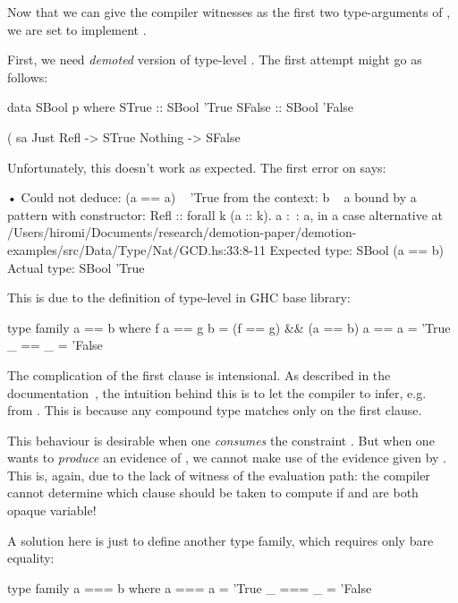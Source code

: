 \documentclass[demotion-paper.tex]{subfiles}
\begin{document}
Now that we can give the compiler witnesses as the first two type-arguments of , we are set to implement .

First, we need \emph{demoted} version of type-level \hask{(==)}.
The first attempt might go as follows:
\begin{code}
data SBool p where
  STrue  :: SBool 'True
  SFalse :: SBool 'False

(%
sa %
  Just Refl -> STrue
  Nothing -> SFalse
\end{code}
Unfortunately, this doesn't work as expected.
The first error on  says:

\begin{repl}
• Could not deduce: (a == a) ~ 'True
  from the context: b ~ a
    bound by a pattern with constructor:
               Refl :: forall k (a :: k). a :~: a,
             in a case alternative
    at /Users/hiromi/Documents/research/demotion-paper/demotion-examples/src/Data/Type/Nat/GCD.hs:33:8-11
  Expected type: SBool (a == b)
    Actual type: SBool 'True
\end{repl}

This is due to the definition of type-level \hask{(==)} in GHC base library:

\begin{code}
type family a == b where
  f a == g b = (f == g) && (a == b)
  a   == a   = 'True
  _   == _   = 'False
\end{code}

The complication of the first clause is intensional.
As described in the documentation~\cite{GHC-Team:2021aa}, the intuition behind this is to let the compiler to infer, e.g.\  from .
This is because any compound type matches only on the first clause.

This behaviour is desirable when one \emph{consumes} the constraint .
But when one wants to \emph{produce} an evidence of , we cannot make use of the evidence given by .
This is, again, due to the lack of witness of the evaluation path: the compiler cannot determine which clause should be taken to compute  if  and  are both opaque variable!

A solution here is just to define another type family, which requires only bare equality:
\begin{code}
type family a === b where
  a === a = 'True
  _ === _ = 'False
\end{code}
\end{document}
